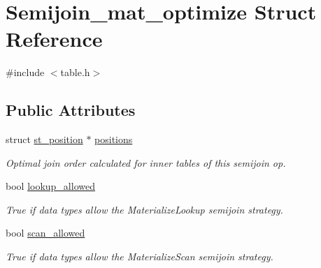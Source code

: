 \hypertarget{structSemijoin__mat__optimize}{}\section{Semijoin\+\_\+mat\+\_\+optimize Struct Reference}
\label{structSemijoin__mat__optimize}


{\ttfamily \#include $<$table.\+h$>$}

\subsection*{Public Attributes}
\begin{DoxyCompactItemize}
\item 
\mbox{\label{structSemijoin__mat__optimize_a64190010b2d734e906ad6c3cb63d3832}} 
struct \mbox{\hyperlink{structst__position}{st\+\_\+position}} $\ast$ \mbox{\hyperlink{structSemijoin__mat__optimize_a64190010b2d734e906ad6c3cb63d3832}{positions}}
\begin{DoxyCompactList}\small\item\em Optimal join order calculated for inner tables of this semijoin op. \end{DoxyCompactList}\item 
\mbox{\label{structSemijoin__mat__optimize_a5a5be2d028c3bc10f2053b5d64fdc037}} 
bool \mbox{\hyperlink{structSemijoin__mat__optimize_a5a5be2d028c3bc10f2053b5d64fdc037}{lookup\+\_\+allowed}}
\begin{DoxyCompactList}\small\item\em True if data types allow the Materialize\+Lookup semijoin strategy. \end{DoxyCompactList}\item 
\mbox{\label{structSemijoin__mat__optimize_a00ed7608a42f44e46c66118a9a325699}} 
bool \mbox{\hyperlink{structSemijoin__mat__optimize_a00ed7608a42f44e46c66118a9a325699}{scan\+\_\+allowed}}
\begin{DoxyCompactList}\small\item\em True if data types allow the Materialize\+Scan semijoin strategy. \end{DoxyCompactList}\item 
\mbox{\label{structSemijoin__mat__optimize_a933e3977fcf5bf765573cff3740743c8}} 

\end{DoxyCompactItemize}
